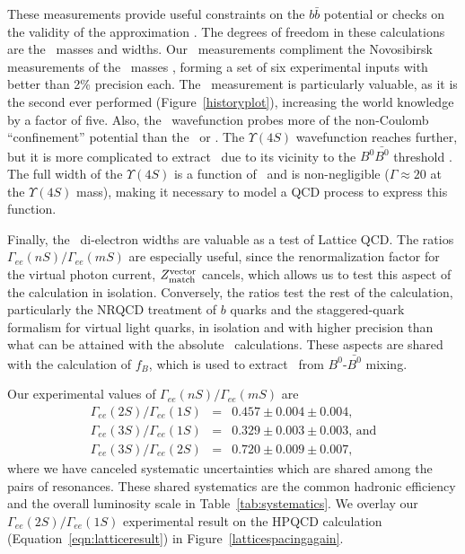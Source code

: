 \documentclass{cornell}
\begin{document}
These measurements provide useful constraints on the $b\bar{b}$
potential or checks on the validity of the approximation
\cite{oldpot}.  The degrees of freedom in these calculations are the
\ups\ masses and widths.  Our \gee\ measurements compliment the
Novosibirsk measurements of the \ups\ masses \cite{novomass}, forming
a set of six experimental inputs with better than 2\% precision each.
The \usss\ measurement is particularly valuable, as it is the second
ever performed (Figure~\ref{historyplot}), increasing the world
knowledge by a factor of five.  Also, the \usss\ wavefunction probes
more of the non-Coulomb ``confinement'' potential than the \us\ or
\uss.  The $\Upsilon(4S)$ wavefunction reaches further, but it is more
complicated to extract \gee\ due to its vicinity to the $B^0\bar{B^0}$
threshold \cite{argus}.  The full width of the $\Upsilon(4S)$ is a
function of \ecm\ and is non-negligible ($\Gamma \approx 20$ at the
$\Upsilon(4S)$ mass), making it necessary to model a QCD process to
express this function.

Finally, the \ups\ di-electron widths are valuable as a test of
Lattice QCD.  The ratios $\Gamma_{ee}(nS)/\Gamma_{ee}(mS)$ are
especially useful, since the renormalization factor for the virtual
photon current, $Z_{\mbox{\scriptsize match}}^{\mbox{\scriptsize vector}}$ cancels, which allows
us to test this aspect of the calculation in isolation.  Conversely,
the ratios test the rest of the calculation, particularly the NRQCD
treatment of $b$ quarks and the staggered-quark formalism for virtual
light quarks, in isolation and with higher precision than what can be
attained with the absolute \gee\ calculations.  These aspects are
shared with the calculation of $f_B$, which is used to extract \vtd\
from $B^0$-$\bar{B^0}$ mixing.

Our experimental values of $\Gamma_{ee}(nS)/\Gamma_{ee}(mS)$ are
\begin{eqnarray}
  \Gamma_{ee}(2S)/\Gamma_{ee}(1S) &=& 0.457 \pm 0.004 \pm 0.004 \mbox{,} \label{eqn:ssovers} \\
  \Gamma_{ee}(3S)/\Gamma_{ee}(1S) &=& 0.329 \pm 0.003 \pm 0.003 \mbox{, and} \\
  \Gamma_{ee}(3S)/\Gamma_{ee}(2S) &=& 0.720 \pm 0.009 \pm 0.007 \mbox{,}
\end{eqnarray}
where we have canceled systematic uncertainties which are shared among
the pairs of resonances.  These shared systematics are the common
hadronic efficiency and the overall luminosity scale in
Table~\ref{tab:systematics}.  We overlay our
$\Gamma_{ee}(2S)/\Gamma_{ee}(1S)$ experimental result on the HPQCD
calculation (Equation~\ref{eqn:latticeresult}) in
Figure~\ref{latticespacingagain}.
\end{document}
